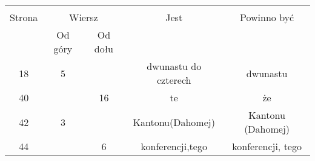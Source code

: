 \documentclass[a4paper,11pt]{article}
\begin{document}
\vspace{\spaceTwo}











%
%
%

\begin{center}

  \begin{tabular}{|c|c|c|c|c|}
    \hline
    & \multicolumn{2}{c|}{} & & \\
    Strona & \multicolumn{2}{c|}{Wiersz} & Jest
                              & Powinno być \\ \cline{2-3}
    & Od góry & Od dołu & & \\
    \hline
    18  &  5 & & dwunastu do czterech & dwunastu \\
    40  & & 16 & te & że \\
    42  &  3 & & Kantonu(Dahomej) & Kantonu (Dahomej) \\
    44  & &  6 & konferencji,tego & konferencji, tego \\
    \hline
  \end{tabular}

\end{center}










\end{document}
